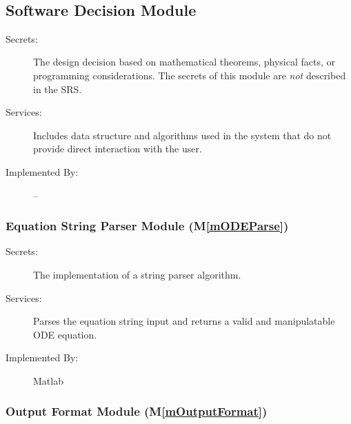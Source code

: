 \documentclass[12pt, titlepage]{article}
\newcommand{\mref}[1]{M\ref{#1}}
\begin{document}
%

~\newpage

\subsection{Software Decision Module}

\begin{description}
\item[Secrets:] The design decision based on mathematical theorems, physical
  facts, or programming considerations. The secrets of this module are
  \emph{not} described in the SRS.
\item[Services:] Includes data structure and algorithms used in the system that
  do not provide direct interaction with the user. 
\item[Implemented By:] --
\end{description}

\subsubsection{Equation String Parser Module (\mref{mODEParse})}

\begin{description}
\item[Secrets:]The implementation of a string parser algorithm.
\item[Services:]Parses the equation string input and returns a valid and manipulatable ODE equation.
\item[Implemented By:] Matlab
\end{description}

\subsubsection{Output Format Module (\mref{mOutputFormat})}
\end{document}
